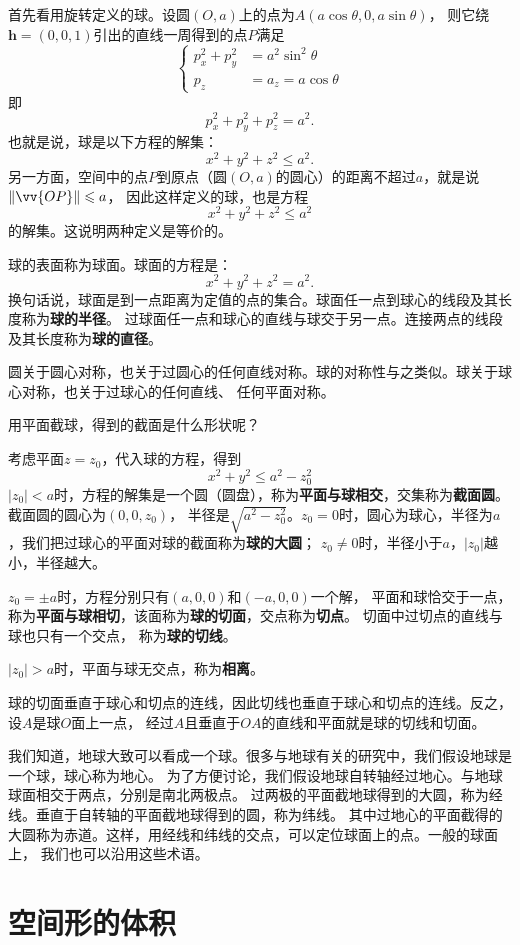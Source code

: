 \documentclass[12pt,UTF8]{ctexbook}
\begin{document}
首先看用旋转定义的球。设圆$(O,a)$上的点为$A(a\cos{\theta}, 0, a\sin{\theta})$，
则它绕$\mathbf{h} = (0,0,1)$引出的直线一周得到的点$P$满足
$$
\left\{
\begin{array}{rl}
p_x^2+p_y^2 &= a^2\sin^2{\theta} \\
p_z &= a_z = a\cos{\theta}
\end{array}
\right.
$$
即
$$ p_x^2 + p_y^2 + p_z^2 = a^2.$$
也就是说，球是以下方程的解集：
$$ x^2 + y^2 + z^2 \leqslant a^2.$$
另一方面，空间中的点$P$到原点（圆$(O,a)$的圆心）的距离不超过$a$，就是说$\|\vv{OP}\| \leqslant a$​，
因此这样定义的球，也是方程
$$ x^2 + y^2 + z^2 \leqslant a^2$$
的解集。这说明两种定义是等价的。

球的表面称为球面。球面的方程是：
$$ x^2 + y^2 + z^2 = a^2.$$
换句话说，球面是到一点距离为定值的点的集合。球面任一点到球心的线段及其长度称为\textbf{球的半径}。
过球面任一点和球心的直线与球交于另一点。连接两点的线段及其长度称为\textbf{球的直径}。

圆关于圆心对称，也关于过圆心的任何直线对称。球的对称性与之类似。球关于球心对称，也关于过球心的任何直线、
任何平面对称。

用平面截球，得到的截面是什么形状呢？

考虑平面$z=z_0$，代入球的方程，得到
$$ x^2 + y^2 \leqslant a^2-z_0^2 $$
$|z_0|<a$时，方程的解集是一个圆（圆盘），称为\textbf{平面与球相交}，交集称为\textbf{截面圆}。截面圆的圆心为$(0,0,z_0)$，
半径是$\sqrt{a^2-z_0^2}$。$z_0=0$时，圆心为球心，半径为$a$，我们把过球心的平面对球的截面称为\textbf{球的大圆}；
$z_0\neq 0$时，半径小于$a$，$|z_0|$越小，半径越大。

$z_0=\pm a$时，方程分别只有$(a,0,0)$和$(-a,0,0)$一个解，
平面和球恰交于一点，称为\textbf{平面与球相切}，该面称为\textbf{球的切面}，交点称为\textbf{切点}。
切面中过切点的直线与球也只有一个交点，
称为\textbf{球的切线}。

$|z_0|>a$时，平面与球无交点，称为\textbf{相离}。

球的切面垂直于球心和切点的连线，因此切线也垂直于球心和切点的连线。反之，设$A$是球$O$面上一点，
经过$A$且垂直于$OA$的直线和平面就是球的切线和切面。

我们知道，地球大致可以看成一个球。很多与地球有关的研究中，我们假设地球是一个球，球心称为地心。
为了方便讨论，我们假设地球自转轴经过地心。与地球球面相交于两点，分别是南北两极点。
过两极的平面截地球得到的大圆，称为经线。垂直于自转轴的平面截地球得到的圆，称为纬线。
其中过地心的平面截得的大圆称为赤道。这样，用经线和纬线的交点，可以定位球面上的点。一般的球面上，
我们也可以沿用这些术语。

\chapter{空间形的体积}
\end{document}
